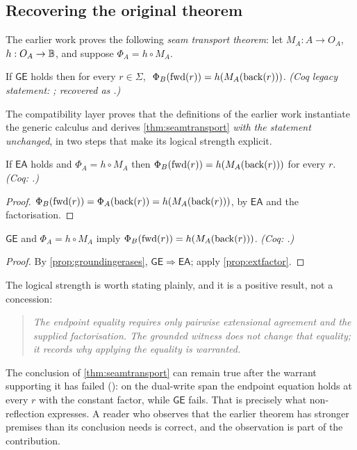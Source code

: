 \subsection{Recovering the original theorem}
The earlier work proves the following \emph{seam transport theorem}: let $M_A : A \to O_A$, $h : O_A \to \mathbb{B}$, and suppose $\Phi_A = h \circ M_A$.
\begin{thm}\label{thm:seamtransport}
If $\mathsf{GE}$ holds then for every $r \in \Sigma$, $\ \Phi_B(\mathrm{fwd}(r)) = h(M_A(\mathrm{back}(r)))$. \emph{(Coq legacy statement: ; recovered as .)}
\end{thm}
The compatibility layer proves that the definitions of the earlier work instantiate the generic calculus and derives \cref{thm:seamtransport} \emph{with the statement unchanged}, in two steps that make its logical strength explicit.
\begin{prop}\label{prop:extfactor}
If $\mathsf{EA}$ holds and $\Phi_A = h \circ M_A$ then $\Phi_B(\mathrm{fwd}(r)) = h(M_A(\mathrm{back}(r)))$ for every $r$. \emph{(Coq: .)}
\end{prop}
\begin{proof}
$\Phi_B(\mathrm{fwd}(r)) = \Phi_A(\mathrm{back}(r)) = h(M_A(\mathrm{back}(r)))$, by $\mathsf{EA}$ and the factorisation.
\end{proof}
\begin{cor}\label{cor:groundedfactor}
$\mathsf{GE}$ and $\Phi_A = h \circ M_A$ imply $\Phi_B(\mathrm{fwd}(r)) = h(M_A(\mathrm{back}(r)))$. \emph{(Coq: .)}
\end{cor}
\begin{proof}
By \cref{prop:groundingerases}, $\mathsf{GE} \Rightarrow \mathsf{EA}$; apply \cref{prop:extfactor}.
\end{proof}
The logical strength is worth stating plainly, and it is a positive result, not a concession:
\begin{quote}
\emph{The endpoint equality requires only pairwise extensional agreement and the supplied factorisation. The grounded witness does not change that equality; it records why applying the equality is warranted.}
\end{quote}
The conclusion of \cref{thm:seamtransport} can remain true after the warrant supporting it has failed (): on the dual-write span the endpoint equation holds at every $r$ with the constant factor, while $\mathsf{GE}$ fails. That is precisely what non-reflection expresses. A reader who observes that the earlier theorem has stronger premises than its conclusion needs is correct, and the observation is part of the contribution.

